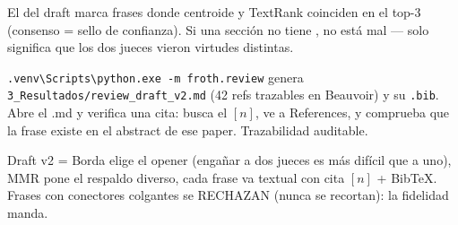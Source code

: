 \documentclass[11pt,a4paper]{article}
\begin{document}
\begin{ojo}
El \dag{} del draft marca frases donde centroide y TextRank coinciden en el top-3
(consenso = sello de confianza). Si una sección no tiene \dag, no está mal --- solo
significa que los dos jueces vieron virtudes distintas.
\end{ojo}

\begin{practica}
\texttt{.venv\textbackslash Scripts\textbackslash python.exe -m froth.review} genera
\texttt{3\_Resultados/review\_draft\_v2.md} (42 refs trazables en Beauvoir) y su
\texttt{.bib}. Abre el .md y verifica una cita: busca el $[n]$, ve a References, y
comprueba que la frase existe en el abstract de ese paper. Trazabilidad auditable.
\end{practica}

\begin{resumen}
Draft v2 = Borda elige el opener (engañar a dos jueces es más difícil que a uno),
MMR pone el respaldo diverso, cada frase va textual con cita $[n]$ + BibTeX. Frases con
conectores colgantes se RECHAZAN (nunca se recortan): la fidelidad manda.
\end{resumen}
\end{document}
